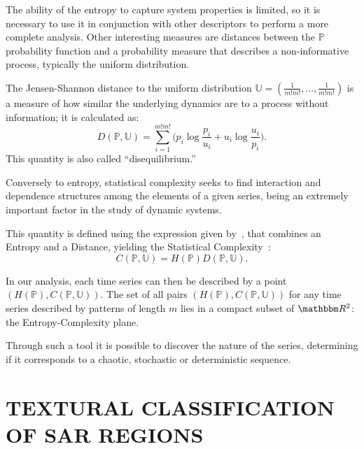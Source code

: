 \documentclass{isprs}
\begin{document}
	The ability of the entropy to capture system properties is limited, so it is necessary to use it in conjunction with other des\-criptors to perform a more complete analysis.
	Other interesting measures are distances between the $\mathbb{P}$ probability function and a probability measure that describes a non-informative process, typically the uniform distribution.
	
	The Jensen-Shannon distance to the uniform distribution $\mathbb{U} = (\frac{1}{m!m!}, \dots, \frac{1}{m!m!})$ is a measure of how similar the underlying dynamics are to a process without information; it is calculated as:
	\begin{equation}
	D(\mathbb{P}, \mathbb{U}) = \sum_{i=1}^{m!m!} \Big(p_i \log\frac{p_i}{u_i} +
	u_i \log\frac{u_i}{p_i}
	\Big).
	\end{equation}
	This quantity is also called ``disequilibrium.''
	
	Conversely to entropy, statistical complexity seeks to find interaction and dependence structures among the elements of a given series, being an extremely important factor in the study of dynamic systems.
	
	This quantity is defined using the expression given by~\cite{Lopez1995statistical}, 
	that combines an Entropy and a Distance, yielding the Statistical Complexity~\cite{Feldman2008information,Feldman1998Statistical}:
	\begin{equation}
	C(\mathbb{P}, \mathbb{U}) = H(\mathbb{P}) D(\mathbb{P}, \mathbb{U}).
	\end{equation}
	
	In our analysis, each time series can then be described by a point $(H(\mathbb{P}), C(\mathbb{P}, \mathbb{U}))$.
	The set of all pairs $(H(\mathbb{P}), C(\mathbb{P}, \mathbb{U}))$ for any time series described by patterns of length $m$ lies in a compact subset of $\mathbbm R^2$: the Entropy-Complexity plane. 
	
	Through such a tool it is possible to discover the nature of the series, determining if it corresponds to a chaotic, stochastic or deterministic sequence.
	
	\section{TEXTURAL CLASSIFICATION OF SAR REGIONS}\label{SAR}
	
\end{document}
